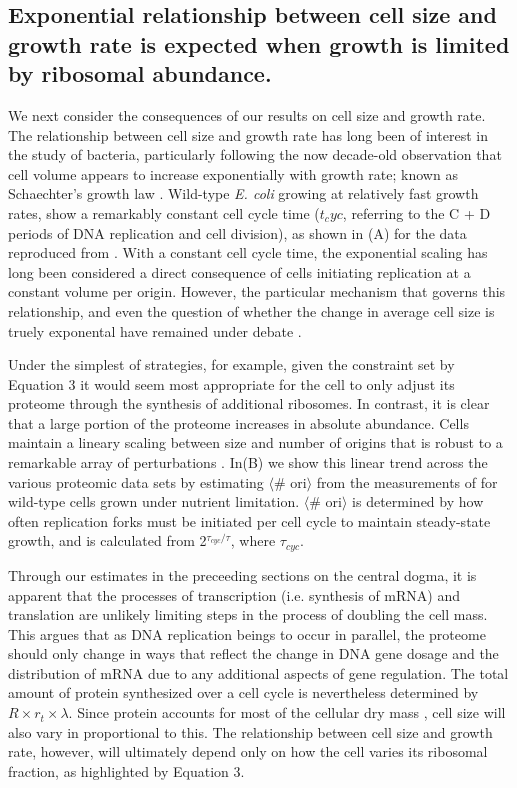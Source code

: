 \subsection{Exponential relationship between cell size and growth rate is
expected when growth is limited by ribosomal abundance.}

We next consider the consequences of our results on 
cell size and growth rate. The relationship between cell size and growth rate
has long been of interest in the study of bacteria, particularly following the
now decade-old observation that cell volume appears to increase exponentially
with growth rate; known as Schaechter's growth law  \citep{schaechter1958,
taheriaraghi2015}. Wild-type \textit{E. coli} growing at relatively fast growth
rates, show a remarkably constant cell cycle time ($t_cyc$, referring to the C +
D periods of DNA replication and cell division), as shown in (A) for the
data reproduced from \citep{si2017}. With a constant cell cycle time, the
exponential scaling has long been considered a direct consequence of cells
initiating replication at a constant volume per origin. However, the particular
mechanism that governs this relationship, and even the question of whether the
change in average cell size is truely exponental have remained under
debate \citep{si2017, harris2018}.

Under the simplest of strategies, for example, given the constraint set by
Equation 3 it would seem most appropriate for the cell to only adjust its
proteome through the synthesis of additional ribosomes. In contrast, it is clear
that a large portion of the proteome increases in absolute abundance. Cells
maintain a lineary scaling between size and number of origins that is robust to
a remarkable array of perturbations \citep{si2017}.  In(B) we show this
linear trend across the various proteomic data sets by estimating $\langle$\#
ori$\rangle$ from the measurements of \cite{si2017} for wild-type cells grown
under nutrient limitation. $\langle$\# ori$\rangle$ is determined by how often
replication forks must be initiated per cell cycle to maintain steady-state
growth, and is calculated from  2$^{\tau_{cyc} / \tau}$, where $\tau_{cyc}$.

Through our estimates in the preceeding sections on the central dogma, it is
apparent that the processes of transcription (i.e. synthesis of mRNA) and
translation are unlikely limiting steps in the process of doubling the
cell mass. This argues that as DNA replication beings to occur in parallel, the
proteome should only change in ways that reflect the change in DNA gene dosage
and the distribution of mRNA due to any additional aspects of gene regulation.
The total amount of protein synthesized over a cell cycle is nevertheless
determined by $R \times r_t \times \lambda$. Since protein accounts for most of
the cellular dry mass \citep{bremer2008, basan2015}, cell size will also vary
in proportional to this. The relationship between cell size and growth rate,
however, will ultimately depend only on how the cell varies its ribosomal
fraction, as highlighted by Equation 3.

